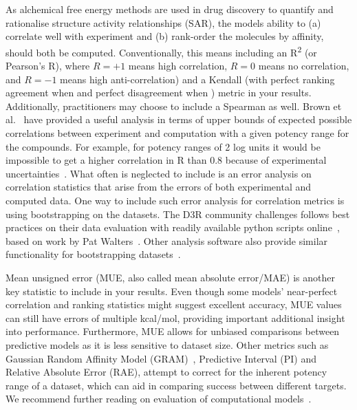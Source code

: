 \documentclass[9pt,bestpractices,pubversion]{livecoms}
\begin{document}
As alchemical free energy methods are used in drug discovery to quantify and rationalise structure activity relationships (SAR), the models ability to (a) correlate well with experiment and (b) rank-order the molecules by affinity, should both be computed. Conventionally, this means including an R\textsuperscript{2} (or Pearson's R), where $R=+1$ means high correlation, $R=0$ means no correlation, and $R=-1$ means high anti-correlation) and a Kendall \texttau{} (with perfect ranking agreement when  and perfect disagreement when ) metric in your results. Additionally, practitioners may choose to include a Spearman \textrho{} as well. Brown et al.~\cite{brown2009healthy} have provided a useful analysis in terms of upper bounds of expected possible correlations between experiment and computation with a given potency range for the compounds. For example, for potency ranges of 2 log units it would be impossible to get a higher correlation in R than 0.8 because of experimental uncertainties~\cite{brown2009healthy}. What often is neglected to include is an error analysis on correlation statistics that arise from the errors of both experimental and computed data. One way to include such error analysis for correlation metrics is using bootstrapping on the datasets. The D3R community challenges follows best practices on their data evaluation with readily available python scripts online~\cite{2018drugdata}, based on work by Pat Walters~\cite{walters2013what}. Other analysis software also provide similar functionality for bootstrapping datasets~\cite{antonia2019michellab}. 

Mean unsigned error (MUE, also called mean absolute error/MAE) is another key statistic to include in your results. Even though some models' near-perfect correlation and ranking statistics might suggest excellent accuracy, MUE values can still have errors of multiple kcal/mol, providing important additional insight into performance. Furthermore, MUE allows for unbiased comparisons between predictive models as it is less sensitive to dataset size. Other metrics such as Gaussian Random Affinity Model (GRAM)~\cite{cui2020gram}, Predictive Interval (PI) and Relative Absolute Error (RAE), attempt to correct for the inherent potency range of a dataset, which can aid in comparing success between different targets. We recommend further reading on evaluation of computational models~\cite{jain2008recommendations, walters2013what, brown2009healthy, walterthoughts}.
\end{document}
